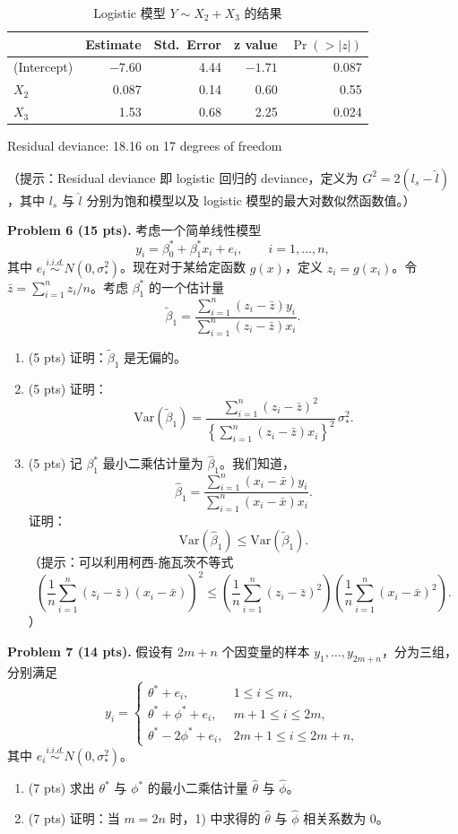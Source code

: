\documentclass[11pt]{ctexart}
\begin{document}
\begin{table}[h]
\centering
\caption{Logistic 模型 $Y \sim X_2 + X_3$ 的结果}
\label{tab:mt2p5b}
\begin{tabular}{lrrrr}
\toprule
 & Estimate & Std.\ Error & z value & $\Pr(>|z|)$ \\
\midrule
(Intercept) & $-7.60$ & 4.44 & $-1.71$ & 0.087 \\
$X_2$ & 0.087 & 0.14 & 0.60 & 0.55 \\
$X_3$ & 1.53 & 0.68 & 2.25 & 0.024 \\
\bottomrule
\end{tabular}

\vspace{0.3em}
\centering Residual deviance: 18.16 on 17 degrees of freedom
\end{table}

\noindent（提示：Residual deviance 即 logistic 回归的 deviance，定义为 $G^2 = 2(l_s - \hat{l})$，其中 $l_s$ 与 $\hat{l}$ 分别为饱和模型以及 logistic 模型的最大对数似然函数值。）

\noindent\textbf{Problem 6 (15 pts).} 考虑一个简单线性模型
\[
y_i = \beta_0^* + \beta_1^* x_i + e_i, \qquad i = 1, \ldots, n,
\]
其中 $e_i \stackrel{i.i.d.}{\sim} N(0, \sigma_*^2)$。现在对于某给定函数 $g(x)$，定义 $z_i = g(x_i)$。令 $\bar{z} = \sum_{i=1}^n z_i / n$。考虑 $\beta_1^*$ 的一个估计量
\[
\tilde{\beta}_1 = \frac{\sum_{i=1}^n (z_i - \bar{z}) y_i}{\sum_{i=1}^n (z_i - \bar{z}) x_i}.
\]
\begin{enumerate}
\item (5 pts) 证明：$\tilde{\beta}_1$ 是无偏的。
\item (5 pts) 证明：
\[
\mathrm{Var}(\tilde{\beta}_1) = \frac{\sum_{i=1}^n (z_i - \bar{z})^2}{\left\{\sum_{i=1}^n (z_i - \bar{z}) x_i\right\}^2}\, \sigma_*^2.
\]
\item (5 pts) 记 $\beta_1^*$ 最小二乘估计量为 $\hat{\beta}_1$。我们知道，
\[
\hat{\beta}_1 = \frac{\sum_{i=1}^n (x_i - \bar{x}) y_i}{\sum_{i=1}^n (x_i - \bar{x}) x_i}.
\]
证明：
\[
\mathrm{Var}(\hat{\beta}_1) \leq \mathrm{Var}(\tilde{\beta}_1).
\]
（提示：可以利用柯西-施瓦茨不等式
\[
\left(\frac{1}{n}\sum_{i=1}^n (z_i - \bar{z})(x_i - \bar{x})\right)^2
\leq
\left(\frac{1}{n}\sum_{i=1}^n (z_i - \bar{z})^2\right)
\left(\frac{1}{n}\sum_{i=1}^n (x_i - \bar{x})^2\right).
\]）
\end{enumerate}

\noindent\textbf{Problem 7 (14 pts).} 假设有 $2m + n$ 个因变量的样本 $y_1, \ldots, y_{2m+n}$，分为三组，分别满足
\[
y_i = \begin{cases}
\theta^* + e_i, & 1 \leq i \leq m,\\[0.2em]
\theta^* + \phi^* + e_i, & m+1 \leq i \leq 2m,\\[0.2em]
\theta^* - 2\phi^* + e_i, & 2m+1 \leq i \leq 2m+n,
\end{cases}
\]
其中 $e_i \stackrel{i.i.d.}{\sim} N(0, \sigma_*^2)$。
\begin{enumerate}
\item (7 pts) 求出 $\theta^*$ 与 $\phi^*$ 的最小二乘估计量 $\hat{\theta}$ 与 $\hat{\phi}$。
\item (7 pts) 证明：当 $m = 2n$ 时，1) 中求得的 $\hat{\theta}$ 与 $\hat{\phi}$ 相关系数为 $0$。
\end{enumerate}
\end{document}
